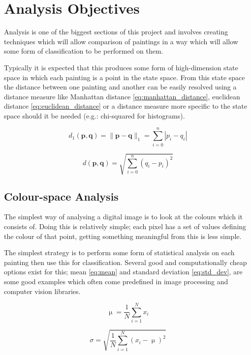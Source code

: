\section{Analysis Objectives}
Analysis is one of the biggest sections of this project and involves creating techniques which 
will allow comparison of paintings in a way which will allow some form of classification to be
performed on them.

Typically it is expected that this produces some form of high-dimension state space in which each
painting is a point in the state space. From this state space the distance between one painting
and another can be easily resolved using a distance measure like Manhattan distance 
\eqref{eq:manhattan_distance}, euclidean distance \eqref{eq:euclidean_distance} or a distance 
measure more specific to the state space should it be needed (e.g.: chi-squared for histograms).

\begin{equation}\label{eq:manhattan_distance}
d_1(\mathbf{p},\mathbf{q}) = \|\mathbf{p}-\mathbf{q}\|_1 = \sum^{n}_{i=0}{|p_i-q_i|}
\end{equation}

\begin{equation}\label{eq:euclidean_distance}
d(\mathbf{p}, \mathbf{q}) = \sqrt{\sum^{n}_{i=0}({q_i-p_i})^2}
\end{equation}

\subsection{Colour-space Analysis}
The simplest way of analysing a digital image is to look at the colours which it consists of.
Doing this is relatively simple; each pixel has a set of values defining the colour of that point,
getting something meaningful from this is less simple.

The simplest strategy is to perform some form of statistical analysis on each painting then use
this for classification. Several good and computationally cheap options exist for this; 
mean \eqref{eq:mean} and standard deviation \eqref{eq:std_dev}, are some good
examples which often come predefined in image processing and computer vision libraries.

\begin{equation}\label{eq:mean}
\upmu = \frac{1}{N}\sum_{i=1}^{N}x_i
\end{equation}

\begin{equation}\label{eq:std_dev}
\sigma = \sqrt{\frac{1}{N}\sum_{i=1}^{N}(x_i - \upmu)^2}
\end{equation}

